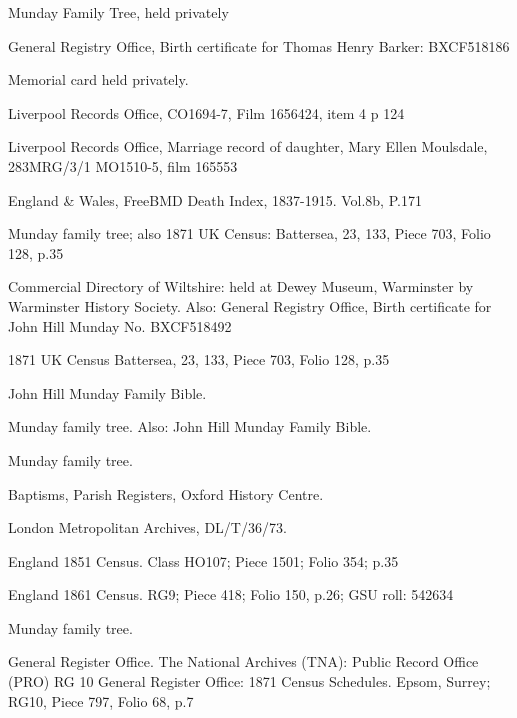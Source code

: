 \begin{thebibliography}{99}
	Munday Family Tree, held privately

	 General Registry Office, Birth certificate for Thomas Henry Barker: BXCF518186
	 
	 Memorial card held privately.
	 
	Liverpool Records Office, CO1694-7, Film 1656424, item 4 p 124

	Liverpool Records Office, Marriage record of daughter, Mary Ellen Moulsdale, 283MRG/3/1 MO1510-5, film 165553

	England \& Wales, FreeBMD Death Index, 1837-1915. Vol.8b, P.171
	
	Munday family tree; also
	1871 UK Census: Battersea, 23, 133, Piece 703, Folio 128, p.35 
	
	Commercial Directory of Wiltshire: held at Dewey Museum, Warminster by Warminster History Society.
	Also: General Registry Office, Birth certificate for John Hill Munday No. BXCF518492
	
	1871 UK Census
	Battersea, 23, 133, Piece 703, Folio 128, p.35
	
	John Hill Munday Family Bible.
	
	Munday family tree. Also:
	John Hill Munday Family Bible. 
	
	Munday family tree. 
	
	 Baptisms, Parish Registers, Oxford History Centre.
	 
	 London Metropolitan Archives, DL/T/36/73. 
	 
	England 1851 Census.
	Class HO107; Piece 1501; Folio 354; p.35
	
	England 1861 Census.
	RG9; Piece 418; Folio 150, p.26; GSU roll: 542634
	
	Munday family tree.
	
	General Register Office. The National Archives (TNA): Public Record Office (PRO) RG 10 General Register Office: 1871 Census Schedules.
	Epsom, Surrey; RG10, Piece 797, Folio 68, p.7
	

\end{thebibliography}
